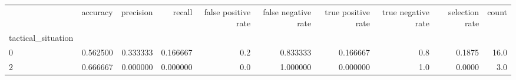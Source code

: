 \begin{tabular}{lrrrrrrrrr}
\toprule
{} &  accuracy &  precision &    recall &  false positive rate &  false negative rate &  true positive rate &  true negative rate &  selection rate &  count \\
tactical\_situation &           &            &           &                      &                      &                     &                     &                 &        \\
\midrule
0                  &  0.562500 &   0.333333 &  0.166667 &                  0.2 &             0.833333 &            0.166667 &                 0.8 &          0.1875 &   16.0 \\
2                  &  0.666667 &   0.000000 &  0.000000 &                  0.0 &             1.000000 &            0.000000 &                 1.0 &          0.0000 &    3.0 \\
\bottomrule
\end{tabular}
